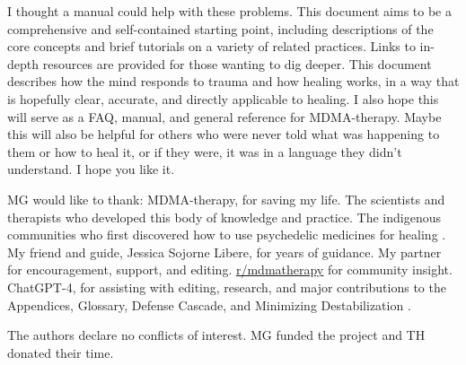 \documentclass[12pt,letterpaper]{article}
\begin{document}
I thought a manual could help with these problems. This document aims to be a comprehensive and self-contained starting point, including descriptions of the core concepts and brief tutorials on a variety of related practices. Links to in-depth resources are provided for those wanting to dig deeper. This document describes how the mind responds to trauma and how healing works, in a way that is hopefully clear, accurate, and directly applicable to healing. I also hope this will serve as a FAQ, manual, and general reference for MDMA-therapy. Maybe this will also be helpful for others who were never told what was happening to them or how to heal it, or if they were, it was in a language they didn't understand. I hope you like it.

MG would like to thank: MDMA-therapy, for saving my life. The scientists and therapists who developed this body of knowledge and practice. The indigenous communities who first discovered how to use psychedelic medicines for healing \cite{davisOneRiver}. My friend and guide, Jessica Sojorne Libere, for years of guidance. My partner for encouragement, support, and editing. \href{https://www.reddit.com/r/mdmatherapy}{r/mdmatherapy} for community insight. ChatGPT-4, for assisting with editing, research, and major contributions to the Appendices, Glossary, Defense Cascade, and Minimizing Destabilization \cite{openaiGPT}.

The authors declare no conflicts of interest. MG funded the project and TH donated their time.
\end{document}
